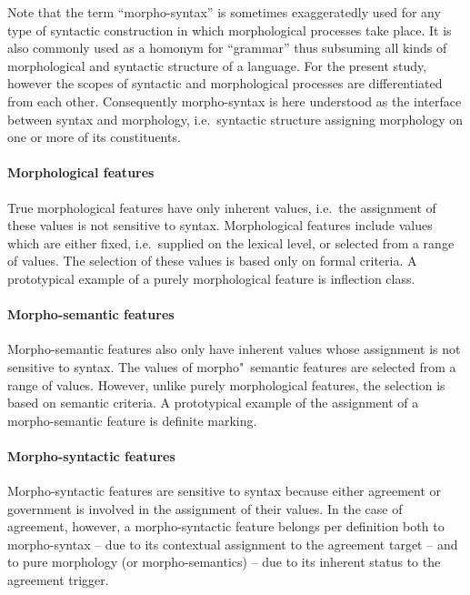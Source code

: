 Note that the term “morpho-syntax” is sometimes exaggeratedly used for any type of syntactic construction in which morphological processes take place. It is also commonly used as a homonym for “grammar” thus subsuming all kinds of morphological and syntactic structure of a language. For the present study, however the scopes of syntactic and morphological processes are differentiated from each other. Consequently morpho-syntax is here understood as the interface between syntax and morphology, i.e.~syntactic structure assigning morphology on one or more of its constituents.

\paragraph{Morphological features} True morphological features have only inherent values, i.e.~the assignment of these values is not sensitive to syntax. Morphological features include values which are either fixed, i.e.~supplied on the lexical level, or selected from a range of values. The selection of these values is based only on formal criteria. A prototypical example of a purely morphological feature is inflection class.

\paragraph{Morpho-semantic features} Morpho-semantic features also only have inherent values whose assignment is not sensitive to syntax. The values of morpho"~semantic features are selected from a range of values. However, unlike purely morphological features, the selection is based on semantic criteria. A prototypical example of the assignment of a morpho-semantic feature is definite marking.

\paragraph{Morpho-syntactic features} Morpho-syntactic features are sensitive to syntax because either agreement or government is involved in the assignment of their values. In the case of agreement, however, a morpho-syntactic feature belongs per definition both to morpho-syntax – due to its contextual assignment to the agreement target – and to pure morphology (or morpho-semantics) – due to its inherent status to the agreement trigger.

